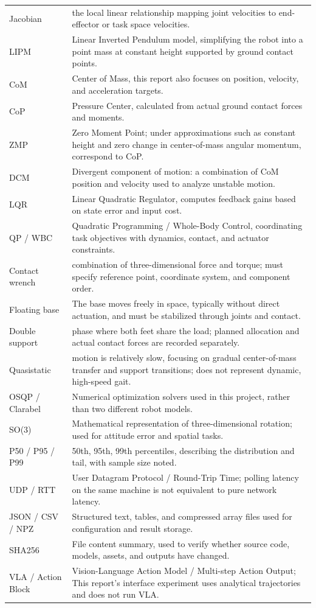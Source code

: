 \begin{longtable}{p{.20\linewidth}p{.70\linewidth}}
Jacobian & the local linear relationship mapping joint velocities to end-effector or task space velocities. \\
LIPM & Linear Inverted Pendulum model, simplifying the robot into a point mass at constant height supported by ground contact points. \\
CoM & Center of Mass, this report also focuses on position, velocity, and acceleration targets.\\
CoP & Pressure Center, calculated from actual ground contact forces and moments.\\
ZMP & Zero Moment Point; under approximations such as constant height and zero change in center-of-mass angular momentum, correspond to CoP.\\
DCM & Divergent component of motion: a combination of CoM position and velocity used to analyze unstable motion.\\
LQR & Linear Quadratic Regulator, computes feedback gains based on state error and input cost.\\
QP / WBC & Quadratic Programming / Whole-Body Control, coordinating task objectives with dynamics, contact, and actuator constraints.\\
Contact wrench & combination of three-dimensional force and torque; must specify reference point, coordinate system, and component order.\\
Floating base & The base moves freely in space, typically without direct actuation, and must be stabilized through joints and contact. \\
Double support & phase where both feet share the load; planned allocation and actual contact forces are recorded separately. \\
Quasistatic & motion is relatively slow, focusing on gradual center-of-mass transfer and support transitions; does not represent dynamic, high-speed gait. \\
OSQP / Clarabel & Numerical optimization solvers used in this project, rather than two different robot models.\\
SO(3) & Mathematical representation of three-dimensional rotation; used for attitude error and spatial tasks.\\
P50 / P95 / P99 & 50th, 95th, 99th percentiles, describing the distribution and tail, with sample size noted.\\
UDP / RTT & User Datagram Protocol / Round-Trip Time; polling latency on the same machine is not equivalent to pure network latency.\\
JSON / CSV / NPZ & Structured text, tables, and compressed array files used for configuration and result storage.\\
SHA256 & File content summary, used to verify whether source code, models, assets, and outputs have changed.\\
VLA / Action Block & Vision-Language Action Model / Multi-step Action Output; This report's interface experiment uses analytical trajectories and does not run VLA.\\
\bottomrule\end{longtable}
